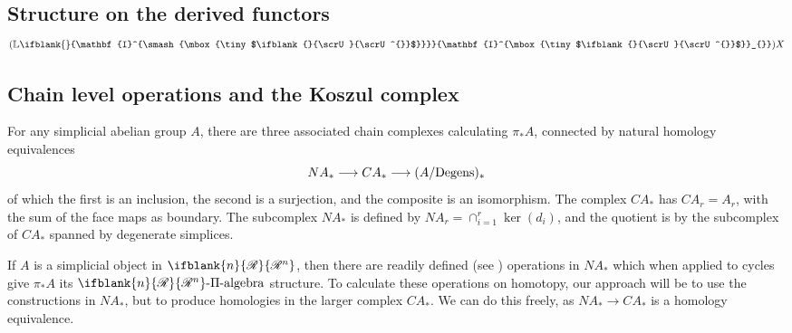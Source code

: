 \documentclass[10pt]{article}
\newcommand{\PRLie}[1]%
{\ifblank{#1}{\scrR}{\scrR^{#1}}}
\newcommand{\nontop}[1]{\ifblank{#1}{\scrU}{\scrU^{#1}}}
\newcommand{\PiAlgebra}[1]{#1\textup{-$\Pi$-algebra}}
\newcommand{\Ind}[2][]{\ifblank{#1}{\mathbf{I}^{\smash{\mbox{\tiny $#2$}}}}{\mathbf{I}^{\mbox{\tiny $#2$}}_{#1}}}%
\newcommand{\BarConst}[1]{B^{\smash{\mbox{\tiny $#1$}}}}
\newcommand{\derived}{\mathbb{L}}
\newcommand{\ModDegeneracies}[1]{(#1/\textup{Degens})}
\begin{document}
\begin{LieLambdaStructureOnKoszul}
\section{Structure on the derived functors $(\derived\Ind{\nontop{}})X$} 
\subsection{Chain level operations and the Koszul complex} \label{SectionHtpyOpnsOnLieAlgs}
For any simplicial abelian group $A$, %
there are three associated chain complexes calculating $\pi_*A$, connected by natural homology equivalences
\[NA_*\to CA_*\to \ModDegeneracies{A}_*\]
of which the first is an inclusion, the second is a surjection, and the composite is an isomorphism. The complex $CA_*$ has $CA_r=A_r$, with the sum of the face maps as boundary. The subcomplex $NA_*$ is defined by $NA_r=\cap_{i=1}^r\ker(d_i)$, and the quotient is by the subcomplex of $CA_*$ spanned by degenerate simplices.

If $A$ is a simplicial object in $\PRLie{n}$, then there are readily defined (see \cite[\S8]{CurtisSimplicialHtpy.pdf}) operations in $NA_*$ which when applied to cycles give $\pi_*A$ its $\PiAlgebra{\PRLie{n}}$ structure. %
To calculate these operations on homotopy, our approach will be to use the constructions in $NA_*$, but to produce homologies in the larger complex $CA_*$. We can do this freely, as $NA_*\to CA_*$ is a homology equivalence.


\end{LieLambdaStructureOnKoszul}
\end{document}
